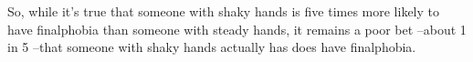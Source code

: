 \documentclass[12pt,twoside]{article}
\newlength{\strutheight}
\newcommand{\prcond}[2]{%
  \ifinner \settoheight{\strutheight}{$#1 #2$}
  \else    \settoheight{\strutheight}{$\displaystyle#1 #2$} \fi%
  \mathop{\textup{Pr}}\nolimits\left(
    #1\,\left|\protect\rule{0cm}{\strutheight}\right.\,#2
  \right)}
\begin{document}
\begin{problem}
{		So, while it's true that someone with shaky hands is five times more
		likely to have finalphobia than someone with steady hands, it remains a
		poor bet --about 1 in 5 --that someone with shaky hands actually has does
		have finalphobia.}

		\end{problem}


%
%
%
%
%
%
%
%
%
\end{document}
